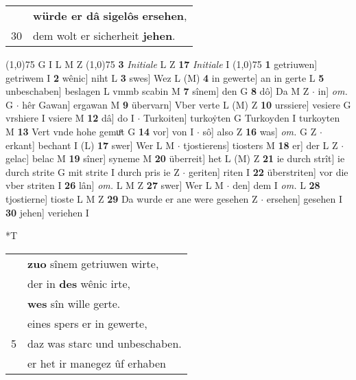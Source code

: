 \documentclass[8pt,a4paper,notitlepage]{article}
\begin{document}
\begin{table}[ht]
\begin{minipage}[t]{0.5\linewidth}
\begin{tabular}{rl}
 & \textbf{würde er dâ} \textbf{sigelôs} \textbf{ersehen},\\ 
30 & dem wolt er sicherheit \textbf{jehen}.\\ 
\end{tabular}
\scriptsize
\line(1,0){75} \newline
G I L M Z \newline
\line(1,0){75} \newline
\textbf{3} \textit{Initiale} L Z  \textbf{17} \textit{Initiale} I  \newline
\line(1,0){75} \newline
\textbf{1} getriuwen] getriwem I \textbf{2} wênic] niht L \textbf{3} swes] Wez L (M) \textbf{4} in gewerte] an in gerte L \textbf{5} unbeschaben] beslagen L vmmb scabin M \textbf{7} sînem] den G \textbf{8} dô] Da M Z  $\cdot$ in] \textit{om.} G  $\cdot$ hêr Gawan] ergawan M \textbf{9} übervarn] Vber verte L (M) Z \textbf{10} urssiere] vesiere G vrshiere I vsiere M \textbf{12} dâ] do I  $\cdot$ Turkoiten] turkoẏten G Turkoyden I turkoyten M \textbf{13} Vert vnde hohe gemuͦt G \textbf{14} vor] von I  $\cdot$ sô] also Z \textbf{16} was] \textit{om.} G Z  $\cdot$ erkant] bechant I (L) \textbf{17} swer] Wer L M  $\cdot$ tjostierens] tiosters M \textbf{18} er] der L Z  $\cdot$ gelac] belac M \textbf{19} sîner] syneme M \textbf{20} überreit] het L (M) Z \textbf{21} ie durch strît] ie durch strite G mit strite I durch pris ie Z  $\cdot$ geriten] riten I \textbf{22} überstriten] vor die vber striten I \textbf{26} lân] \textit{om.} L M Z \textbf{27} swer] Wer L M  $\cdot$ den] dem I \textit{om.} L \textbf{28} tjostierne] tioste L M Z \textbf{29} Da wurde er ane were gesehen Z  $\cdot$ ersehen] gesehen I \textbf{30} jehen] veriehen I \newline
\end{minipage}
\hspace{0.5cm}
\begin{minipage}[t]{0.5\linewidth}
\small
\begin{center}*T
\end{center}
\begin{tabular}{rl}
 & \textbf{zuo} sînem getriuwen wirte,\\ 
 & der in \textbf{des} wênic irte,\\ 
 & \textbf{wes} sîn wille gerte.\\ 
 & eines spers er in gewerte,\\ 
5 & daz was starc und unbeschaben.\\ 
 & er het ir manegez ûf erhaben\\ 

\end{tabular}
\end{minipage}
\end{table}
\end{document}
